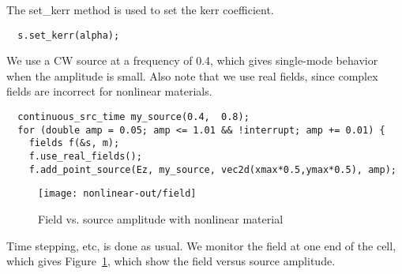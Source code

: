 The set\_kerr method is used to set the kerr coefficient.

\begin{verbatim}
  s.set_kerr(alpha);
\end{verbatim}

We use a CW source at a frequency of 0.4, which gives single-mode behavior
when the amplitude is small.  Also note that we use real fields, since
complex fields are incorrect for nonlinear materials.

\begin{verbatim}
  continuous_src_time my_source(0.4,  0.8);
  for (double amp = 0.05; amp <= 1.01 && !interrupt; amp += 0.01) {
    fields f(&s, m);
    f.use_real_fields();
    f.add_point_source(Ez, my_source, vec2d(xmax*0.5,ymax*0.5), amp);
\end{verbatim}

\begin{figure}
\label{nonlinear_field}
\caption{Field vs. source amplitude with nonlinear material}
\texttt{[image: nonlinear-out/field]}
\end{figure}

Time stepping, etc, is done as usual.  We monitor the field at one end of
the cell, which gives Figure~\ref{nonlinear_field}, which show the field
versus source amplitude.

\begin{comment}
    master_printf("Working with A=%
    double next_printtime = 400;
    while (f.time() < 10.1*xmax && !interrupt) {
      if (f.time() >= next_printtime) {
        next_printtime += 100;
        //master_printf("Working on time %
        //master_printf("energy is %
        f.eps_slices();
        //f.eps_slices(geometric_volume(vec2d(xmax/2+1.0,0), vec2d(xmax,ymax)));
      }
      f.step();
    }
    g.output_point(amp, real(f.get_field(Ez,vec2d(1.2*pml,ymax/2))));
  }
}
\end{comment}
